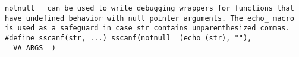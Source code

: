 \example \tt{notnull__} can be used to write debugging wrappers for
functions that have undefined behavior with null pointer arguments.
The \tt{echo_} macro is used as a safeguard in
case \tt{str} contains unparenthesized commas.\\

\tt{#define sscanf(str, ...) sscanf(notnull__(echo_(str), ""), __VA_ARGS__)}
